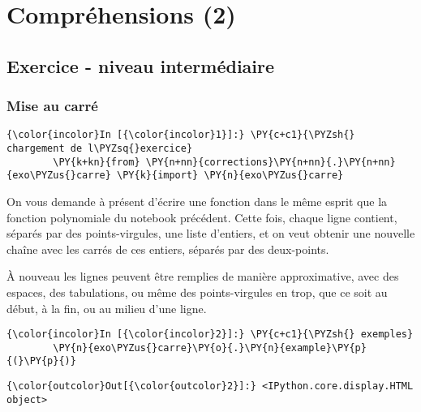     
    
    
    

    

    \hypertarget{compruxe9hensions-2}{%
\section{Compréhensions (2)}\label{compruxe9hensions-2}}

    \hypertarget{exercice---niveau-intermuxe9diaire}{%
\subsection{Exercice - niveau
intermédiaire}\label{exercice---niveau-intermuxe9diaire}}

    \hypertarget{mise-au-carruxe9}{%
\subsubsection{Mise au carré}\label{mise-au-carruxe9}}

    \begin{Verbatim}[commandchars=\\\{\}]
{\color{incolor}In [{\color{incolor}1}]:} \PY{c+c1}{\PYZsh{} chargement de l\PYZsq{}exercice}
        \PY{k+kn}{from} \PY{n+nn}{corrections}\PY{n+nn}{.}\PY{n+nn}{exo\PYZus{}carre} \PY{k}{import} \PY{n}{exo\PYZus{}carre}
\end{Verbatim}


    On vous demande à présent d'écrire une fonction dans le même esprit que
la fonction polynomiale du notebook précédent. Cette fois, chaque ligne
contient, séparés par des points-virgules, une liste d'entiers, et on
veut obtenir une nouvelle chaîne avec les carrés de ces entiers, séparés
par des deux-points.

À nouveau les lignes peuvent être remplies de manière approximative,
avec des espaces, des tabulations, ou même des points-virgules en trop,
que ce soit au début, à la fin, ou au milieu d'une ligne.

    \begin{Verbatim}[commandchars=\\\{\}]
{\color{incolor}In [{\color{incolor}2}]:} \PY{c+c1}{\PYZsh{} exemples}
        \PY{n}{exo\PYZus{}carre}\PY{o}{.}\PY{n}{example}\PY{p}{(}\PY{p}{)}
\end{Verbatim}


\begin{Verbatim}[commandchars=\\\{\}]
{\color{outcolor}Out[{\color{outcolor}2}]:} <IPython.core.display.HTML object>
\end{Verbatim}
            

